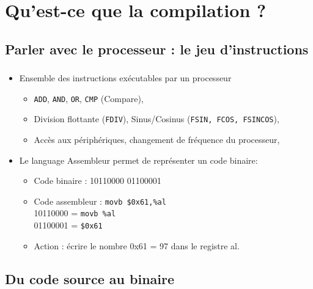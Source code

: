 
\section{Qu'est-ce que la compilation ?}

\subsection{Parler avec le processeur : le jeu d'instructions}

\begin{frame}[fragile]
\frametitle{\insertsubsection}
\begin{itemize}
  \item Ensemble des instructions exécutables par un processeur
    \begin{itemize}
    \item \texttt{ADD}, \texttt{AND}, \texttt{OR}, \texttt{CMP} (Compare),\…
     \item Division flottante (\texttt{FDIV}), Sinus/Cosinus (\texttt{FSIN, FCOS, FSINCOS}),\…
     \item Accès aux périphériques, changement de fréquence du processeur,\…
    \end{itemize}
  \item Le language Assembleur permet de représenter un code binaire:
    \begin{itemize}
      \item Code binaire : 10110000 01100001
      \item Code assembleur : \texttt{movb \$0x61,\%al}\\
            10110000 = \texttt{movb \%al}\\
            01100001 = \texttt{\$0x61}
      \item Action : écrire le nombre 0x61 = 97 dans le registre al.
    \end{itemize}
\end{itemize}
\end{frame}

\subsection{Du code source au binaire}

